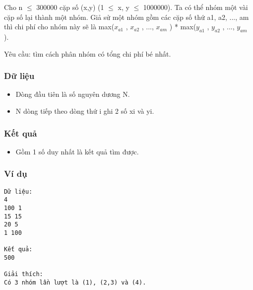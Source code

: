



   Cho n $\le$ 300000 cặp số (x,y) (1 $\le$ x, y $\le$ 1000000). Ta có thể nhóm một vài cặp số lại thành một nhóm. Giả sử một nhóm gồm các cặp số thứ a1, a2, ..., am thì chi phí cho nhóm này sẽ là max($x_{a1}$   , $x_{a2}$   , ..., $x_{am}$   ) * max($y_{a1}$   , $y_{a2}$   , ..., $y_{am}$   ).  

   Yêu cầu: tìm cách phân nhóm có tổng chi phí bé nhất.  

\subsubsection{   Dữ liệu  }
\begin{itemize}
	\item     Dòng đầu tiên là số nguyên dương N.   
	\item     N dòng tiếp theo dòng thứ i ghi 2 số xi và yi.   
\end{itemize}

\subsubsection{   Kết quả  }
\begin{itemize}
	\item     Gồm 1 số duy nhất là kết quả tìm được.   
\end{itemize}

\subsubsection{   Ví dụ  }
\begin{verbatim}
Dữ liệu:
4
100 1
15 15
20 5
1 100

Kết quả:
500

Giải thích: 
Có 3 nhóm lần lượt là (1), (2,3) và (4). 

\end{verbatim}
